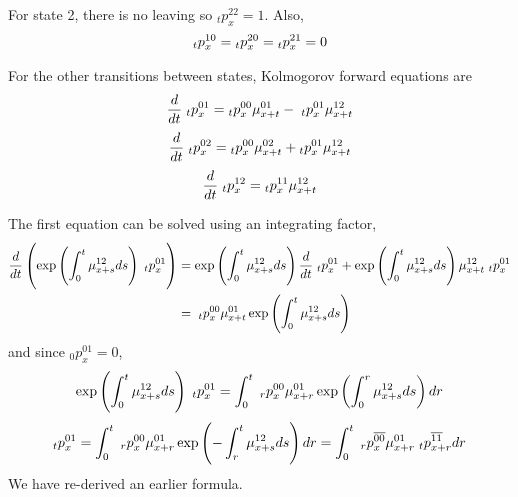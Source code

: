 \documentclass[hidelinks, 12pt]{article}
\theoremstyle{mydefstyle}
\theoremstyle{mythmstyle}
\begin{document}
For state 2, there is no leaving so $_tp_x^{22} = 1$. Also,
\begin{gather*}
_tp_x^{10} = \hspace{0mm}_tp_x^{20} = \hspace{0mm}_tp_x^{21} = 0
\end{gather*}

For the other transitions between states, Kolmogorov forward equations are
\begin{gather*}
\frac{d}{dt} \hspace{1mm}_tp_x^{01} 
= \hspace{0mm}_tp_x^{00} \mu_{x+t}^{01}
- \hspace{1mm}_tp_x^{01} \mu_{x+t}^{12}
\end{gather*}
\begin{gather*}
\frac{d}{dt} \hspace{1mm}_tp_x^{02}
= \hspace{0mm}_tp_x^{00} \mu_{x+t}^{02}
+ \hspace{0mm}_tp_x^{01} \mu_{x+t}^{12}
\end{gather*}
\begin{gather*}
\frac{d}{dt} \hspace{1mm}_tp_x^{12}
= \hspace{0mm}_tp_x^{11} \mu_{x+t}^{12}
\end{gather*}

The first equation can be solved using an integrating factor,
\begin{align*}
\frac{d}{dt} \left( \exp \left( \int_0^t \mu_{x+s}^{12} ds \right) \hspace{1mm}_tp_x^{01} \right)
&= \exp \left( \int_0^t \mu_{x+s}^{12} ds \right) \frac{d}{dt} \hspace{1mm}_tp_x^{01}
+ \exp \left( \int_0^t \mu_{x+s}^{12} ds \right) \mu_{x+t}^{12} \hspace{1mm}_tp_x^{01} \\
&= \hspace{1mm}_tp_x^{00} \mu_{x+t}^{01} \exp \left( \int_0^t \mu_{x+s}^{12} ds \right)
\end{align*}
and since $_0p_x^{01} = 0$, 
\begin{gather*}
\exp \left( \int_0^t \mu_{x+s}^{12} ds \right) \hspace{1mm}_tp_x^{01}
= \int_0^t \hspace{1mm}_rp_x^{00} \mu_{x+r}^{01} \exp \left( \int_0^r \mu_{x+s}^{12} ds \right) dr
\end{gather*}
\begin{gather*}
\hspace{0mm}_tp_x^{01}
= \int_0^t \hspace{1mm}_rp_x^{00} \mu_{x+r}^{01} \exp \left( - \int_r^t \mu_{x+s}^{12} ds \right) dr
= \int_0^t \hspace{1mm}_rp_x^{\overline{00}} \mu_{x+r}^{01} \hspace{1mm}_tp_{x+r}^{\overline{11}} dr
\end{gather*}
We have re-derived an earlier formula.
\end{document}
